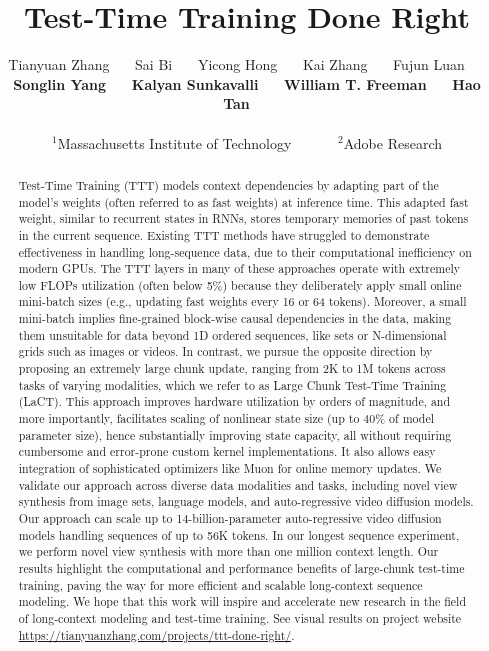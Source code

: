 \documentclass{article}
\title{Test-Time Training Done Right}
\author{
  Tianyuan Zhang\affmark[1]~~~
  Sai Bi\affmark[2]~~~
  Yicong Hong\affmark[2]~~~
  Kai Zhang\affmark[2]~~~
  Fujun Luan\affmark[2]~~~ \\
  \textbf{Songlin Yang\affmark[1]}~~~
  \textbf{Kalyan Sunkavalli\affmark[2]}~~~
  \textbf{William T. Freeman\affmark[1]}~~~
  \textbf{Hao Tan\affmark[2]}~~~ \\ \\
  $^1$Massachusetts Institute of Technology~~~~~~
    $^2$Adobe Research\\

  

  

  

  

  

  

  

  

  

  

}
\begin{document}
\maketitle

\maketitle

\newcommand{\methodname}{LaCT}

\def\capfont{\normalfont\small}

\def\capfontfootnotesize{\normalfont\footnotesize}
\def\capfontscriptsize{\normalfont\scriptsize}

\begin{abstract}

Test-Time Training (TTT) models context dependencies by adapting part of the model's weights (often referred to as fast weights) at inference time. This adapted fast weight, similar to recurrent states in RNNs, stores temporary memories of past tokens in the current sequence. Existing TTT methods have struggled to demonstrate effectiveness in handling long-sequence data, due to their computational inefficiency on modern GPUs. The TTT layers in
many of these approaches operate with extremely low FLOPs utilization (often below 5\%) because they deliberately apply small online mini-batch sizes (e.g., updating fast weights every 16 or 64 tokens).
Moreover, a small mini-batch implies fine-grained block-wise causal dependencies in the data, making them unsuitable for data beyond 1D ordered sequences, like sets or N-dimensional grids such as images or videos.
In contrast, we pursue the opposite direction by proposing an extremely large chunk update, ranging from 2K to 1M tokens across tasks of varying modalities, which we refer to as Large Chunk Test-Time Training (LaCT). 
This approach improves hardware utilization by orders of magnitude, and more importantly, facilitates scaling of nonlinear state size (up to 40\% of model parameter size), hence
substantially improving state capacity, all without requiring cumbersome and error-prone custom kernel implementations.
It also allows easy integration of sophisticated optimizers like Muon for online memory updates.
We validate our approach across diverse data modalities and tasks, including novel view synthesis from image sets, language models, and auto-regressive video diffusion models. 
Our approach can scale up to 14-billion-parameter auto-regressive video diffusion models handling sequences of up to 56K tokens. 
In our longest sequence experiment, we perform novel view synthesis with more than one million context length. Our results highlight the computational and performance benefits of large-chunk test-time training, paving the way for more efficient and scalable long-context sequence modeling. We hope that this work will inspire and accelerate new research in the field of long-context modeling and test-time training.  See visual results on project website \url{https://tianyuanzhang.com/projects/ttt-done-right/}.

\end{abstract}
\end{document}
